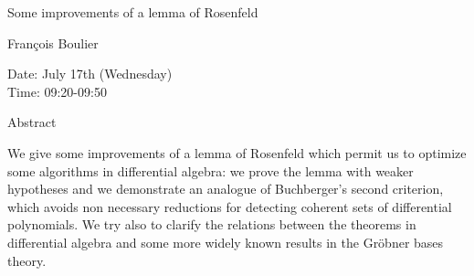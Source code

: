 \begin{center}
\LARGE
Some improvements of a lemma of Rosenfeld

\end{center}

\begin{center}
\Large
Fran\c{c}ois Boulier
\end{center}

\noindent
Date:  July 17th (Wednesday)\\
Time:  09:20-09:50\\

\begin{center}
\large
Abstract
\end{center}

We give some improvements of a lemma of Rosenfeld which permit us to
optimize some algorithms in differential algebra: we prove the
lemma with weaker hypotheses and we demonstrate an analogue
of Buchberger's second criterion, which avoids non necessary
reductions for detecting coherent sets of differential polynomials.
We try also to clarify the relations between the theorems in
differential algebra and some more widely known results in the
Gr\"obner bases theory.


